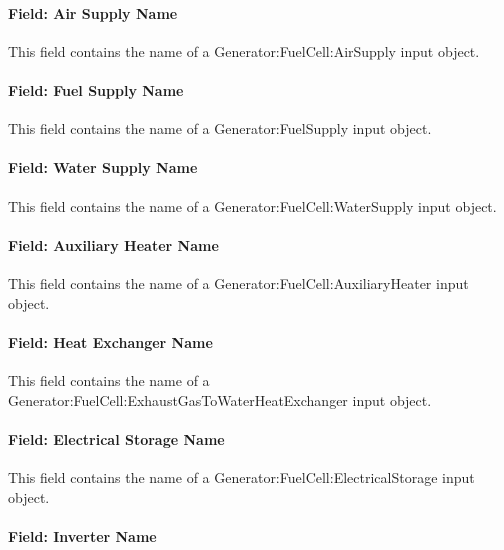 \paragraph{Field: Air Supply Name}\label{field-air-supply-name}

This field contains the name of a Generator:FuelCell:AirSupply input object.

\paragraph{Field: Fuel Supply Name}\label{field-fuel-supply-name}

This field contains the name of a Generator:FuelSupply input object.

\paragraph{Field: Water Supply Name}\label{field-water-supply-name}

This field contains the name of a Generator:FuelCell:WaterSupply input object.

\paragraph{Field: Auxiliary Heater Name}\label{field-auxiliary-heater-name}

This field contains the name of a Generator:FuelCell:AuxiliaryHeater input object.

\paragraph{Field: Heat Exchanger Name}\label{field-heat-exchanger-name-000}

This field contains the name of a Generator:FuelCell:ExhaustGasToWaterHeatExchanger input object.

\paragraph{Field: Electrical Storage Name}\label{field-electrical-storage-name}

This field contains the name of a Generator:FuelCell:ElectricalStorage input object.

\paragraph{Field: Inverter Name}\label{field-inverter-name}

